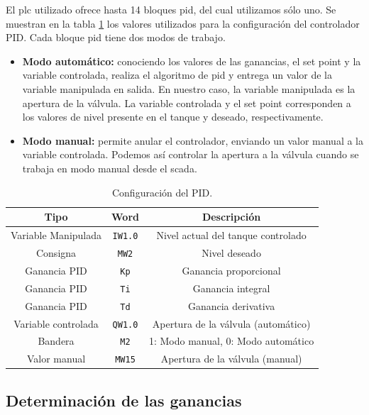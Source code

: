 El \gls{plc} utilizado ofrece hasta 14 bloques \gls{pid}, del cual utilizamos
sólo uno.
Se muestran en la tabla \ref{table:controladorpid} los valores utilizados para
la configuración del controlador PID.
Cada bloque \gls{pid} tiene dos modos de trabajo.
\begin{itemize}
 \item \textbf{Modo automático:} conociendo los valores de las ganancias, el
set point y la variable controlada, realiza el algoritmo de \gls{pid} y entrega
un valor de la variable manipulada en salida.
En nuestro caso, la variable manipulada es la apertura de la válvula.
La variable controlada y el set point corresponden a los valores de nivel
presente en el tanque y deseado, respectivamente.
 \item \textbf{Modo manual:} permite anular el controlador, enviando un valor
manual a la variable controlada.
Podemos así controlar la apertura a la válvula cuando se
trabaja en modo manual desde el \gls{scada}.
\end{itemize}

\begin{table}[!t]
\renewcommand{\arraystretch}{1.3}
\centering
\begin{tabular}{c||c||c}
\hline
\bfseries Tipo & \bfseries Word  & \bfseries Descripción\\
\hline \hline
Variable Manipulada & \verb|IW1.0|  & Nivel actual del tanque controlado\\
Consigna & \verb|MW2|  & Nivel deseado\\
Ganancia PID & \verb|Kp|  & Ganancia proporcional\\
Ganancia PID & \verb|Ti|  & Ganancia integral\\
Ganancia PID & \verb|Td|  & Ganancia derivativa\\
Variable controlada & \verb|QW1.0|  &  Apertura de la válvula (automático)\\
Bandera & \verb|M2|  & 1: Modo manual, 0: Modo automático \\
Valor manual & \verb|MW15|  & Apertura de la válvula (manual)\\
\hline
\end{tabular}
\caption{Configuración del PID.}
\label{table:controladorpid}
\end{table}

\subsection{Determinación de las ganancias}

